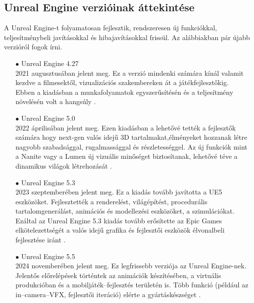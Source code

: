 \documentclass[
]{thesis-ekf}
\theoremstyle{definition}
\theoremstyle{remark}
\begin{document}
\subsection{Unreal Engine verzióinak áttekintése}
A Unreal Engine-t folyamatosan fejlesztik, rendszeresen új funkciókkal, teljesítménybeli javításokkal és hibajavításokkal frissül. Az alábbiakban pár újabb verzióról fogok írni.
\begin{itemize}
	\item[$\bullet$]Unreal Engine 4.27 \\ 2021 augusztusában jelent meg. Ez a verzió mindenki számára kínál valamit kezdve a filmesektől, vizualizációs szakembereken át a játékfejlesztőkig. Ebben a kiadásban a munkafolyamatok egyszerűsítésén és a teljesítmény növelésén volt a hangsúly \cite{Unreal4.27}.
	\item[$\bullet$]Unreal Engine 5.0 \\ 2022 áprilisában jelent meg. Ezen kiadásban a lehetővé tették a fejlesztők számára hogy next-gen valós idejű 3D tartalmakat,élményeket hozzanak létre nagyobb szabadsággal, rugalmassággal és részletességgel. Az új funkciók mint a Nanite vagy a Lumen új vizuális minőséget biztosítanak, lehetővé téve a dinamikus világok létrehozását \cite{Unreal5.0}.
	\item[$\bullet$]Unreal Engine 5.3 \\ 2023 szeptemberében jelent meg. Ez a kiadás tovább javította a UE5 eszközöket. Fejlesztették a renderelést, világépítést, procedurális tartalomgenerálást, animációs és modellezési eszközöket, a szimulációkat. Ezáltal az Unreal Engine 5.3 kiadás tovább erősítette az Epic Games elkötelezettségét a valós idejű grafika és fejlesztői eszközök élvonalbeli fejlesztése iránt \cite{Unreal5.3}.
	\item[$\bullet$]Unreal Engine 5.5 \\ 2024 novemberében jelent meg. Ez legfrissebb verziója az Unreal Engine-nek. Jelentős előrelépések történtek az animációk készítésében, a virtuális produkcióban és a mobiljáték--fejlesztés területén is. Több funkció (például az in--camera--VFX, fejlesztői iteráció) elérte a gyártáskészséget \cite{Unreal5.5}.
\end{itemize}
\end{document}
